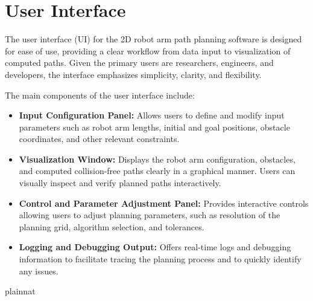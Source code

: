 \documentclass[12pt, titlepage]{article}
\begin{document}


\section{User Interface} \label{SecUI}

The user interface (UI) for the 2D robot arm path planning software is designed for ease of use, providing a clear workflow from data input to visualization of computed paths. Given the primary users are researchers, engineers, and developers, the interface emphasizes simplicity, clarity, and flexibility.

The main components of the user interface include:

\begin{itemize}
    \item \textbf{Input Configuration Panel:}  
    Allows users to define and modify input parameters such as robot arm lengths, initial and goal positions, obstacle coordinates, and other relevant constraints.

    \item \textbf{Visualization Window:}  
      Displays the robot arm configuration, obstacles, and computed collision-free paths clearly in a graphical manner. Users can visually inspect and verify planned paths interactively.

    \item \textbf{Control and Parameter Adjustment Panel:}  
      Provides interactive controls allowing users to adjust planning parameters, such as resolution of the planning grid, algorithm selection, and tolerances.

    \item \textbf{Logging and Debugging Output:}  
      Offers real-time logs and debugging information to facilitate tracing the planning process and to quickly identify any issues.

    \end{itemize}







 {plainnat}


\newpage{}
\end{document}
